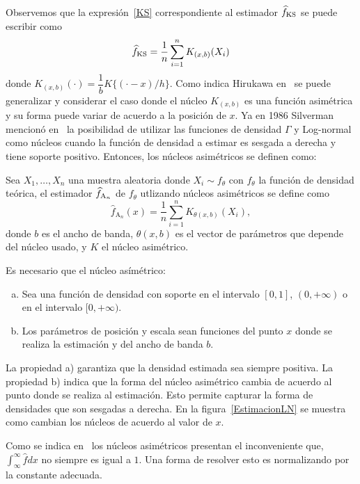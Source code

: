 Observemos que la expresión~\ref{KS} correspondiente al estimador $\widehat{f}_{\tiny \text {KS}}$ se puede escribir como
\begin{align}
\widehat{f}_{\tiny \text {KS}}=\dfrac{1}{n} \sum_{i=1}^n K_{(x,b)} (X_i)
\end{align}
donde $K_{(x,b)}(\cdot) =\dfrac{1}{b} K\{(\cdot-x)/h\}$. Como indica Hirukawa en~\cite{Hirukawa2018} se puede generalizar y considerar el caso donde el núcleo $K_{(x,b)}$ es una función asimétrica y su forma puede variar de acuerdo a la posición de $x$. Ya en 1986 Silverman mencionó en~\cite{Silverman1986} la posibilidad de utilizar las funciones de densidad $\Gamma$ y Log-normal como núcleos cuando la función de densidad a estimar es sesgada a derecha y tiene soporte positivo. Entonces, los núcleos asimétricos se definen como:
\begin{definition}
Sea $X_1, \ldots, X_n$ una muestra aleatoria donde $X_i \sim f_{\theta}$ con $f_{\theta}$ la función de densidad teórica, el estimador $\widehat{f}_{\tiny\text{A}_n}$ de $f_{\theta}$ utlizando núcleos asimétricos se define como 
\begin{equation}
\widehat{f}_{\text{A}_n}(x)=\frac{1}{n}\sum_{i=1}^n K_{\theta(x,b)}(X_i),
\label{fn}
\end{equation}
donde  $b$ es el ancho de banda, ${\theta}(x,b)$ es el vector de parámetros que depende del núcleo usado, y $K$ el núcleo asimétrico.
\end{definition}

Es necesario que el núcleo asímétrico:

\begin{enumerate}[a)]
	\item Sea una función de densidad con soporte en el intervalo $[0,1]$, $(0,+\infty)$ o en el intervalo $[0,+\infty).$
	\item Los parámetros de posición y escala sean funciones del punto $x$ donde se realiza la estimación y del ancho de banda $b$.
\end{enumerate}
La propiedad a) garantiza que la densidad estimada sea siempre positiva. La propiedad b) indica que la forma del núcleo asimétrico cambia de acuerdo al punto donde se realiza al estimación. Esto permite capturar la forma de densidades que son sesgadas a derecha. En la figura~\ref{EstimacionLN} se muestra como cambian los núcleos de acuerdo al valor de $x$.

Como se indica en~\cite{Libnegue2013,Hirukawa2018} los núcleos asimétricos presentan el inconveniente que, $\int_{\infty}^{\infty} \widehat{f} dx$ no siempre es igual a $1$. Una forma de resolver esto es normalizando por la constante adecuada.

